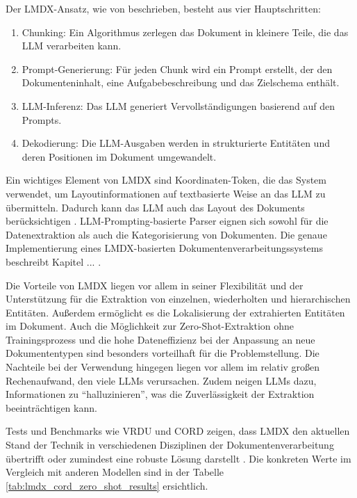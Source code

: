 Der \gls{LMDX}-Ansatz, wie von \textcite{PerotVincent2024LLMD} beschrieben, besteht aus vier Hauptschritten:

\begin{enumerate}
	\item Chunking: Ein Algorithmus zerlegen das Dokument in kleinere Teile, die das \gls{LLM} verarbeiten kann.
	\item Prompt-Generierung: Für jeden Chunk wird ein Prompt erstellt, der den Dokumenteninhalt, eine Aufgabebeschreibung und das Zielschema enthält.
	\item \gls{LLM}-Inferenz: Das \gls{LLM} generiert Vervollständigungen basierend auf den Prompts.
	\item Dekodierung: Die \gls{LLM}-Ausgaben werden in strukturierte Entitäten und deren Positionen im Dokument umgewandelt.
\end{enumerate}

Ein wichtiges Element von \gls{LMDX} sind Koordinaten-Token, die das System verwendet, um Layoutinformationen auf textbasierte Weise an das \gls{LLM} zu übermitteln. Dadurch kann das \gls{LLM} auch das Layout des Dokuments berücksichtigen \parencite{PerotVincent2024LLMD}. LLM-Prompting-basierte Parser eignen sich sowohl für die Datenextraktion als auch die Kategorisierung von Dokumenten. Die genaue Implementierung eines \gls{LMDX}-basierten Dokumentenverarbeitungssystems beschreibt Kapitel ... .

Die Vorteile von \gls{LMDX} liegen vor allem in seiner Flexibilität und der Unterstützung für die Extraktion von einzelnen, wiederholten und hierarchischen Entitäten. Außerdem ermöglicht es die Lokalisierung der extrahierten Entitäten im Dokument. Auch die Möglichkeit zur Zero-Shot-Extraktion ohne Trainingsprozess und die hohe Dateneffizienz bei der Anpassung an neue Dokumententypen sind besonders vorteilhaft für die Problemstellung. Die Nachteile bei der Verwendung hingegen liegen vor allem im relativ großen Rechenaufwand, den viele \glspl{LLM} verursachen. Zudem neigen \glspl{LLM} dazu, Informationen zu ``halluzinieren'', was die Zuverlässigkeit der Extraktion beeinträchtigen kann.

Tests und Benchmarks wie VRDU \parencite{WangZilong2023VABf} und CORD \parencite{park2019cord} zeigen, dass \gls{LMDX} den aktuellen Stand der Technik in verschiedenen Disziplinen der Dokumentenverarbeitung übertrifft oder zumindest eine robuste Lösung darstellt \parencite{PerotVincent2024LLMD}. Die konkreten Werte im Vergleich mit anderen Modellen sind in der Tabelle \ref{tab:lmdx_cord_zero_shot_results} ersichtlich.

